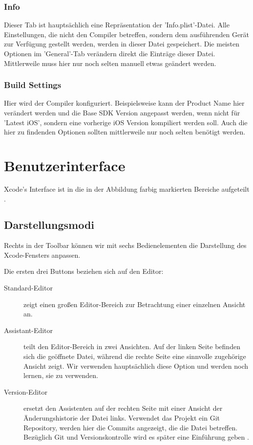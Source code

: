 \documentclass[parskip=half, final]{scrreprt}
\begin{document}
\subsubsection{Info}

Dieser Tab ist hauptsächlich eine Repräsentation der 'Info.plist'-Datei. Alle Einstellungen, die nicht den Compiler betreffen, sondern dem ausführenden Gerät zur Verfügung gestellt werden, werden in dieser Datei gespeichert. Die meisten Optionen im 'General'-Tab verändern direkt die Einträge dieser Datei. Mittlerweile muss hier nur noch selten manuell etwas geändert werden.

\subsubsection{Build Settings}

Hier wird der Compiler konfiguriert. Beispielsweise kann der Product Name hier verändert werden und die Base SDK Version angepasst werden, wenn nicht für 'Latest iOS', sondern eine vorherige iOS Version kompiliert werden soll. Auch die hier zu findenden Optionen sollten mittlerweile nur noch selten benötigt werden.

\section{Benutzerinterface}

Xcode's Interface ist in die in der Abbildung farbig markierten Bereiche aufgeteilt .


\subsection{Darstellungsmodi}

Rechts in der Toolbar können wir mit sechs Bedienelementen die Darstellung des Xcode-Fensters anpassen.

Die ersten drei Buttons beziehen sich auf den Editor:
\begin{description}
\item[Standard-Editor] zeigt einen großen Editor-Bereich zur Betrachtung einer einzelnen Ansicht an.
\item[Assistant-Editor] teilt den Editor-Bereich in zwei Ansichten. Auf der linken Seite befinden sich die geöffnete Datei, während die rechte Seite eine sinnvolle zugehörige Ansicht zeigt. Wir verwenden hauptsächlich diese Option und werden noch lernen, sie zu verwenden.
\item[Version-Editor] ersetzt den Assistenten auf der rechten Seite mit einer Ansicht der Änderungshistorie der Datei links. Verwendet das Projekt ein Git Repository, werden hier die Commits angezeigt, die die Datei betreffen. Bezüglich Git und Versionskontrolle wird es später eine Einführung geben .
\end{description}
\end{document}
